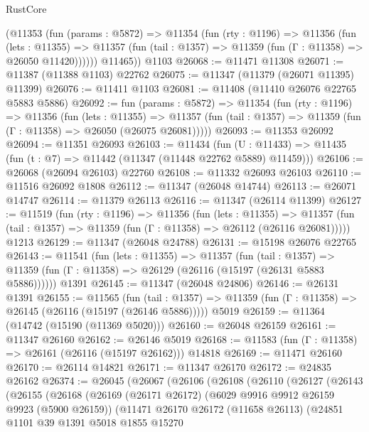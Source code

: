 \begin{lexlean}{RustCore}
\begin{coremodule}
        (@11353
          (fun (params : @5872) =>
          @11354
            (fun (rty : @1196) =>
            @11356
              (fun (lets : @11355) =>
              @11357 (fun (tail : @1357) => @11359 (fun (Γ : @11358) => @26050 @11420))))))
        @11465))
    @1103
@26068 := @11471 @11308
@26071 := @11387 (@11388 @1103) @22762
@26075 := @11347 (@11379 (@26071 @11395) @11399)
@26076 := @11411 @1103
@26081 := @11408 (@11410 @26076 @22765 @5883 @5886)
@26092 := fun (params : @5872) =>
  @11354
    (fun (rty : @1196) =>
    @11356
      (fun (lets : @11355) =>
      @11357 (fun (tail : @1357) => @11359 (fun (Γ : @11358) => @26050 (@26075 @26081)))))
@26093 := @11353 @26092
@26094 := @11351 @26093
@26103 := @11434
    (fun (U : @11433) => @11435 (fun (t : @7) => @11442 (@11347 (@11448 @22762 @5889) @11459)))
@26106 := @26068 (@26094 @26103) @22760
@26108 := @11332 @26093 @26103
@26110 := @11516 @26092 @1808
@26112 := @11347 (@26048 @14744)
@26113 := @26071 @14747
@26114 := @11379 @26113
@26116 := @11347 (@26114 @11399)
@26127 := @11519
    (fun (rty : @1196) =>
    @11356
      (fun (lets : @11355) =>
      @11357 (fun (tail : @1357) => @11359 (fun (Γ : @11358) => @26112 (@26116 @26081)))))
    @1213
@26129 := @11347 (@26048 @24788)
@26131 := @15198 @26076 @22765
@26143 := @11541
    (fun (lets : @11355) =>
    @11357
      (fun (tail : @1357) =>
      @11359 (fun (Γ : @11358) => @26129 (@26116 (@15197 (@26131 @5883 @5886))))))
    @1391
@26145 := @11347 (@26048 @24806)
@26146 := @26131 @1391
@26155 := @11565
    (fun (tail : @1357) => @11359 (fun (Γ : @11358) => @26145 (@26116 (@15197 (@26146 @5886)))))
    @5019
@26159 := @11364 (@14742 (@15190 (@11369 @5020)))
@26160 := @26048 @26159
@26161 := @11347 @26160
@26162 := @26146 @5019
@26168 := @11583 (fun (Γ : @11358) => @26161 (@26116 (@15197 @26162))) @14818
@26169 := @11471 @26160
@26170 := @26114 @14821
@26171 := @11347 @26170
@26172 := @24835 @26162
@26374 := @26045
    (@26067
      (@26106
        (@26108
          (@26110
            (@26127
              (@26143
                (@26155
                  (@26168
                    (@26169
                      (@26171 @26172)
                      (@6029 @9916 @9912 @26159 @9923 (@5900 @26159))
                      (@11471
                        @26170
                        @26172
                        (@11658 @26113)
                        (@24851
                          @1101
                          @39
                          @1391
                          @5018
                          @1855
                          @15270

\end{coremodule}
\end{lexlean}

